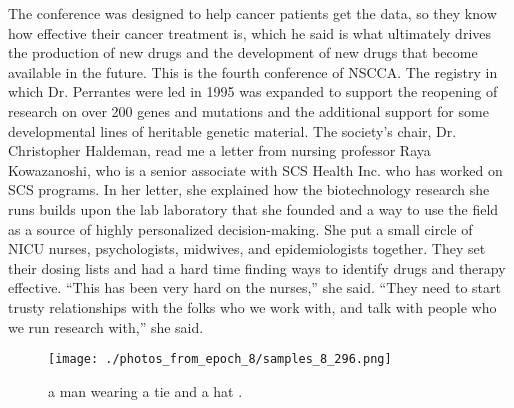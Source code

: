 \documentclass{article}%
\begin{document}
The conference was designed to help cancer patients get the data, so they know how effective their cancer treatment is, which he said is what ultimately drives the production of new drugs and the development of new drugs that become available in the future.\newline%
This is the fourth conference of NSCCA. The registry in which Dr. Perrantes were led in 1995 was expanded to support the reopening of research on over 200 genes and mutations and the additional support for some developmental lines of heritable genetic material.\newline%
The society’s chair, Dr. Christopher Haldeman, read me a letter from nursing professor Raya Kowazanoshi, who is a senior associate with SCS Health Inc. who has worked on SCS programs. In her letter, she explained how the biotechnology research she runs builds upon the lab laboratory that she founded and a way to use the field as a source of highly personalized decision{-}making.\newline%
She put a small circle of NICU nurses, psychologists, midwives, and epidemiologists together. They set their dosing lists and had a hard time finding ways to identify drugs and therapy effective.\newline%
“This has been very hard on the nurses,” she said.\newline%
“They need to start trusty relationships with the folks who we work with, and talk with people who we run research with,” she said.\newline%

%


\begin{figure}[h!]%
\centering%
\texttt{[image: ./photos\_from\_epoch\_8/samples\_8\_296.png]}%
\caption{a man wearing a tie and a hat .}%
\end{figure}

%
\end{document}
